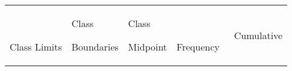 \documentclass[]{book}
\begin{document}
\begin{longtable}[]{@{}lllll@{}}
\toprule
\endhead
\begin{minipage}[t]{0.18\columnwidth}\raggedright
~

Class Limits\strut
\end{minipage} & \begin{minipage}[t]{0.23\columnwidth}\raggedright
Class

Boundaries\strut
\end{minipage} & \begin{minipage}[t]{0.13\columnwidth}\raggedright
Class

Midpoint\strut
\end{minipage} & \begin{minipage}[t]{0.14\columnwidth}\raggedright
~

Frequency\strut
\end{minipage} & \begin{minipage}[t]{0.17\columnwidth}\raggedright
~Cumulative


\end{minipage}
\end{longtable}
\end{document}
